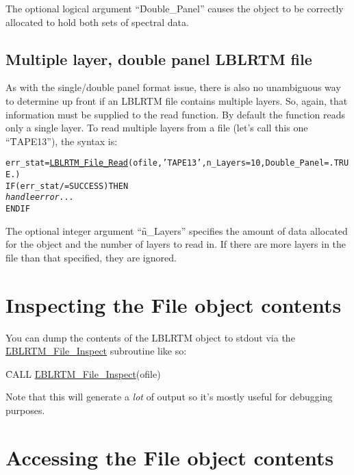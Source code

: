 The optional logical argument ``\f{Double\_Panel}'' causes the \File{} object to be correctly allocated to hold both sets of spectral data.


\subsection{Multiple layer, double panel LBLRTM file}
As with the single/double panel format issue, there is also no unambiguous way to determine up front if an LBLRTM file contains multiple layers. So, again, that information must be supplied to the read function. By default the function reads only a single layer. To read multiple layers from a file (let's call this one ``\f{TAPE13}''), the syntax is:
\begin{alltt}
  err_stat = \hyperref[sec:LBLRTM_File_Read_interface]{LBLRTM_File_Read}(ofile, 'TAPE13', n_Layers=10, Double_Panel=.TRUE.)
  IF ( err_stat /= SUCCESS ) THEN
    \textrm{\textit{handle error...}}
  END IF\end{alltt}

The optional integer argument ``\f{n\_Layers}'' specifies the amount of data allocated for the \File{} object and the number of layers to read in. If there are more layers in the file than that specified, they are ignored. 



\section{Inspecting the File object contents}

You can dump the contents of the LBLRTM \File{} object to stdout via the \hyperref[sec:LBLRTM_File_Inspect_interface]{\f{LBLRTM\_File\_Inspect}} subroutine like so:

\hspace{0.4cm}\f{CALL }\hyperref[sec:LBLRTM_File_Read_interface]{\f{LBLRTM\_File\_Inspect}}(ofile)

Note that this will generate a \emph{lot} of output so it's mostly useful for debugging purposes.



\section{Accessing the File object contents}

